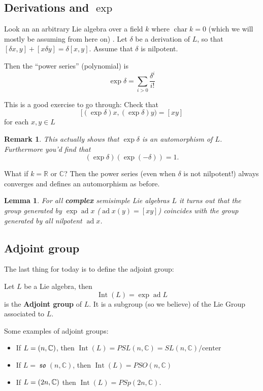 \documentclass[12pt]{article}
\theoremstyle{nonumberbreak}
\theoremstyle{changebreak}
\newtheorem{lem}[thm]{Lemma}
\theoremstyle{nonumberbreak}
\theoremstyle{change}
\newtheorem{rmk}[thm]{Remark}
\newcommand*{\R}{
\mathbb{R}
}
\newcommand*{\C}{
\mathbb{C}
}
\DeclareMathOperator{\ch}{char}
\let\sl\relax
\DeclareMathOperator{\sl}{\mathfrak{sl}}
\DeclareMathOperator{\so}{\mathfrak{so}}
\let\sp\relax
\DeclareMathOperator{\sp}{\mathfrak{sp}}
\DeclareMathOperator{\ad}{ad}
\begin{document}
\subsection{Derivations and $\exp$}
Look an an arbitrary Lie algebra over a field $k$ where $\ch k=0$ (which we will mostly be assuming from here on)
. Let $\delta$ be a derivation of $L$, so that $[\delta x,y]+[x\delta y]=\delta[x,y]$. Assume that $\delta$ is nilpotent.

Then the ``power series'' (polynomial) is
\[\exp\delta=\sum_{i>0}\frac{\delta^i}{i!}\]
\begin{prob}
	This is a good exercise to go through: Check that
	\[[(\exp\delta)x,(\exp \delta)y)=[xy]\]
	for each $x,y\in L$
\end{prob}

\begin{rmk}
	This actually shows that $\exp\delta$ is an automorphism of $L$. Furthermore you'd find that
	\[(\exp\delta)(\exp(-\delta))=1.\]
\end{rmk}

What if $k=\R$ or $\C$? Then the power series (even when $\delta$ is not nilpotent!) always converges
and defines an automorphism as before.

\begin{lem}
	For all \textbf{complex} semisimple Lie algebras $L$ it turns out that the group
	generated by $\exp\ad x$ ($\ad x(y)=[xy]$) coincides with the group generated by all 
	nilpotent $\ad x$.
\end{lem}
\subsection{Adjoint group}
The last thing for today is to define the adjoint group:
\begin{defn}
	Let $L$ be a Lie algebra, then 
	\[\operatorname{Int}(L)=\exp\ad L\]
	is the \textbf{Adjoint group} of $L$. It is a subgroup (so we believe) of the Lie
	Group associated to $L$.
\end{defn}

Some examples of adjoint groups:
\begin{itemize}
	\item If $L=\sl(n,\C)$, then $\operatorname{Int}(L)=PSL(n,\C)=SL(n,\C)/\text{center}$
	\item If $L=\so(n,\C)$, then $\operatorname{Int}(L)=PSO(n,\C)$
	\item If $L=\sp(2n,\C)$ then $\operatorname{Int}(L)=PSp(2n,\C)$.
\end{itemize}
\end{document}
